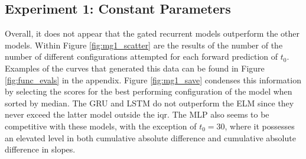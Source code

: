 \documentclass[11pt]{article}
\begin{document}
\subsection {Experiment 1: Constant Parameters}

Overall, it does not appear that the gated recurrent models outperform
the other
models. Within Figure \ref{fig:mg1_scatter} are the results of the
number of the number of different configurations attempted for each forward
prediction of $t_0$. Examples of the curves that generated this data
can be found in Figure \ref{fig:func_evals} in the appendix.  Figure \ref{fig:mg1_save} condenses this information by selecting the scores for
the best performing configuration of the model when sorted by
median. The GRU and LSTM do not
outperform the ELM since they never exceed the latter model outside
the iqr. The MLP also seems to be competitive with these models, with
the exception of $t_0 = 30$, where it possesses an elevated level in
both cumulative absolute difference and cumulative absolute difference
in slopes. 


\end{document}
